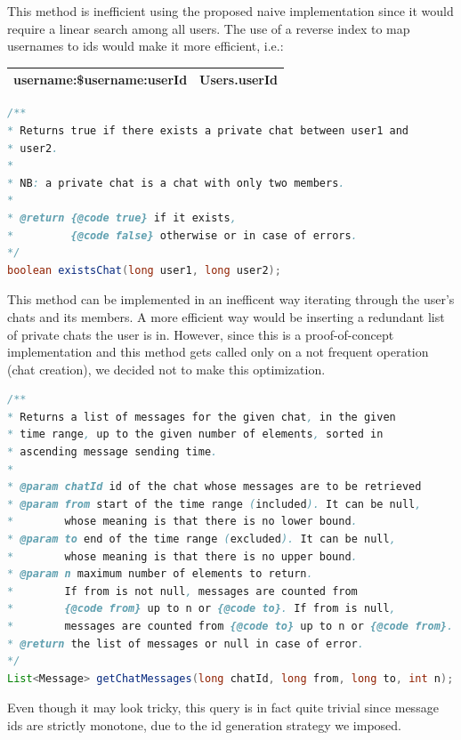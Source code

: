 \documentclass[10pt]{article}
\begin{document}
This method is inefficient using the proposed naive implementation since it 
would require a linear search among all users. 
The use of a reverse index to map usernames to ids would make it more efficient, i.e.:

\begin{center}
    \begin{tabular}{ | c | c | }
        \hline
        username:\$username:userId & Users.userId \\\hline
    \end{tabular}
\end{center}

\begin{lstlisting}[language = Java]
/**
* Returns true if there exists a private chat between user1 and 
* user2.
*
* NB: a private chat is a chat with only two members.
*
* @return {@code true} if it exists, 
*         {@code false} otherwise or in case of errors.
*/
boolean existsChat(long user1, long user2);
\end{lstlisting}

This method can be implemented in an inefficent way iterating through the 
user's chats and its members. A more efficient way would be inserting a
redundant list of private chats the user is in.
However, since this is a proof-of-concept implementation and this method gets 
called only on a not frequent operation (chat creation), we decided not to
make this optimization.

\begin{lstlisting}[language = Java]
/**
* Returns a list of messages for the given chat, in the given 
* time range, up to the given number of elements, sorted in 
* ascending message sending time.
*
* @param chatId id of the chat whose messages are to be retrieved
* @param from start of the time range (included). It can be null, 
*        whose meaning is that there is no lower bound.
* @param to end of the time range (excluded). It can be null, 
*        whose meaning is that there is no upper bound.
* @param n maximum number of elements to return. 
*        If from is not null, messages are counted from 
*        {@code from} up to n or {@code to}. If from is null, 
*        messages are counted from {@code to} up to n or {@code from}.
* @return the list of messages or null in case of error.
*/
List<Message> getChatMessages(long chatId, long from, long to, int n);
\end{lstlisting}

Even though it may look tricky, this query is in fact quite trivial since 
message ids are strictly monotone, due to the id generation strategy we 
imposed.
\end{document}
